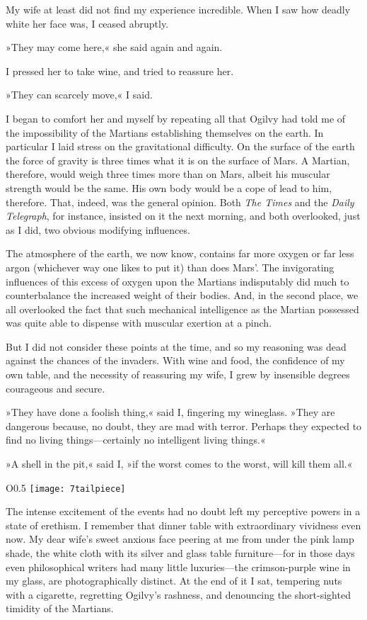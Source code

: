 My wife at least did not find my experience incredible. When I saw how deadly white her face was, I ceased abruptly.

»They may come here,« she said again and again.

I pressed her to take wine, and tried to reassure her.

»They can scarcely move,« I said.

I began to comfort her and myself by repeating all that Ogilvy had told me of the impossibility of the Martians establishing themselves on the earth. In particular I laid stress on the gravitational difficulty. On the surface of the earth the force of gravity is three times what it is on the surface of Mars. A Martian, therefore, would weigh three times more than on Mars, albeit his muscular strength would be the same. His own body would be a cope of lead to him, therefore. That, indeed, was the general opinion. Both \textit{The Times} and the \textit{Daily Telegraph}, for instance, insisted on it the next morning, and both overlooked, just as I did, two obvious modifying influences.

The atmosphere of the earth, we now know, contains far more oxygen or far less argon (whichever way one likes to put it) than does Mars'. The invigorating influences of this excess of oxygen upon the Martians indisputably did much to counterbalance the increased weight of their bodies. And, in the second place, we all overlooked the fact that such mechanical intelligence as the Martian possessed was quite able to dispense with muscular exertion at a pinch.

But I did not consider these points at the time, and so my reasoning was dead against the chances of the invaders. With wine and food, the confidence of my own table, and the necessity of reassuring my wife, I grew by insensible degrees courageous and secure.

»They have done a foolish thing,« said I, fingering my wineglass. »They are dangerous because, no doubt, they are mad with terror. Perhaps they expected to find no living things—certainly no intelligent living things.«

»A shell in the pit,« said I, »if the worst comes to the worst, will kill them all.«

\begin{wrapfigure}{O}{0.5\textwidth}
	\centering
	\texttt{[image: 7tailpiece]}
\end{wrapfigure}

The intense excitement of the events had no doubt left my perceptive powers in a state of erethism. I remember that dinner table with extraordinary vividness even now. My dear wife's sweet anxious face peering at me from under the pink lamp shade, the white cloth with its silver and glass table furniture—for in those days even philosophical writers had many little luxuries—the crimson-purple wine in my glass, are photographically distinct. At the end of it I sat, tempering nuts with a cigarette, regretting Ogilvy's rashness, and denouncing the short-sighted timidity of the Martians.


